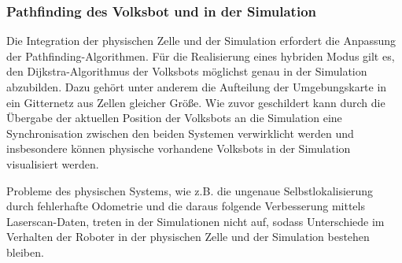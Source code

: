 \subsubsection{Pathfinding des Volksbot und in der Simulation}

Die Integration der physischen Zelle und der Simulation erfordert die Anpassung der Pathfinding-Algorithmen. Für die Realisierung eines hybriden Modus gilt es, den Dijkstra-Algorithmus der Volksbots möglichst genau in der Simulation abzubilden. Dazu gehört unter anderem die Aufteilung der Umgebungskarte in ein Gitternetz aus Zellen gleicher Größe. Wie zuvor geschildert kann durch die Übergabe der aktuellen Position der Volksbots an die Simulation eine Synchronisation zwischen den beiden Systemen verwirklicht werden und insbesondere können physische vorhandene Volksbots in der Simulation visualisiert werden.

Probleme des physischen Systems, wie z.B. die ungenaue Selbstlokalisierung durch fehlerhafte Odometrie und die daraus folgende Verbesserung mittels Laserscan-Daten, treten in der Simulationen nicht auf, sodass Unterschiede im Verhalten der Roboter in der physischen Zelle und der Simulation bestehen bleiben. 
